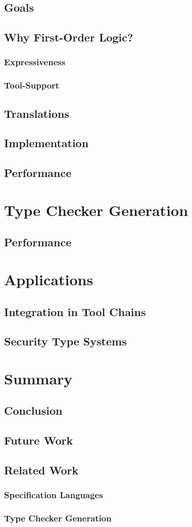 \documentclass[a4paper,twoside]{report}
\begin{document}
\section{Goals}
\section{Why First-Order Logic?}
\subsection{Expressiveness}
\subsection{Tool-Support}
\section{Translations}
\section{Implementation}
\section{Performance}

\chapter{Type Checker Generation}
\section{Performance}

\chapter{Applications}
\section{Integration in Tool Chains}
\section{Security Type Systems}

\chapter{Summary}
\section{Conclusion}
\section{Future Work}
\section{Related Work}
\subsection{Specification Languages}
\subsection{Type Checker Generation}


\end{document}
